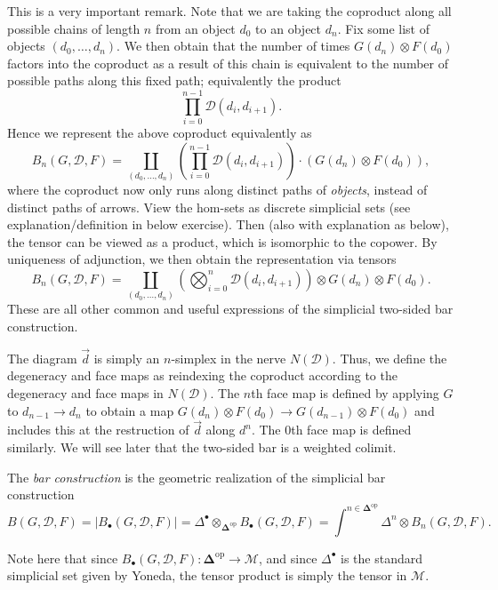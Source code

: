 \begin{remark}
	This is a very important remark. Note that we are taking the coproduct along all possible chains of length $n$ from an object $d_0$ to an object $d_n$. Fix some list of objects $(d_0, \ldots ,d_n)$. We then obtain that the number of times $G(d_n)\otimes F(d_0)$ factors into the coproduct as a result of this chain is equivalent to the number of possible paths along this fixed path; equivalently the product
	\[
		\prod_{i=0}^{n-1} \mathcal{D} (d_i,d_{i+1} )
	.\]
	Hence we represent the above coproduct equivalently as
	\[
		B_n(G,\mathcal{D} ,F)=\coprod_{(d_0, \ldots ,d_n)} \left( \prod_{i=0}^{n-1} \mathcal{D}(d_i,d_{i+1} ) \right) \cdot (G(d_n)\otimes F(d_0)),
	\]
	where the coproduct now only runs along distinct paths of \emph{objects}, instead of distinct paths of arrows. View the hom-sets as discrete simplicial sets (see explanation/definition in below exercise). Then (also with explanation as below), the tensor can be viewed as a product, which is isomorphic to the copower. By uniqueness of adjunction, we then obtain the representation via tensors
	\[
		B_n(G,\mathcal{D} ,F)=\coprod_{(d_0, \ldots ,d_n)} \left( \bigotimes_{i=0} ^n \mathcal{D} (d_i,d_{i+1} ) \right) \otimes G(d_n)\otimes F(d_0)
	.\]
	These are all other common and useful expressions of the simplicial two-sided bar construction.
\end{remark}


The diagram $\vec{d} $ is simply an $n$-simplex in the nerve $N(\mathcal{D})$. Thus, we define the degeneracy and face maps as reindexing the coproduct according to the degeneracy and face maps in $N(\mathcal{D} )$. The $n$th face map is defined by applying $G$ to $d_{n-1} \to d_n$ to obtain a map $G(d_n)\otimes F(d_0)\to G(d_{n-1} )\otimes F(d_0)$ and includes this at the restruction of $\vec{d} $ along $d^n$. The 0th face map is defined similarly. We will see later that the two-sided bar is a weighted colimit.

\begin{definition}[Bar]\label{dfn:4.3}
	The \emph{bar construction} is the geometric realization of the simplicial bar construction
	\[
		B(G,\mathcal{D} ,F)=\left| B_{\bullet} (G,\mathcal{D} ,F) \right| =\Delta^{\bullet} \otimes _{\boldsymbol{\Delta} ^{\mathrm{op}} } B_{\bullet} (G,\mathcal{D} ,F)=\int^{n\in \boldsymbol{\Delta} ^{\mathrm{op}} } \Delta^n \otimes B_n(G,\mathcal{D} ,F)
	.\]
\end{definition}
Note here that since $B_{\bullet} (G,\mathcal{D} ,F): \boldsymbol{\Delta} ^{\mathrm{op}}  \to \mathcal{M} $, and since $\Delta^{\bullet} $ is the standard simplicial set given by Yoneda, the tensor product is simply the tensor in $\mathcal{M} $.

